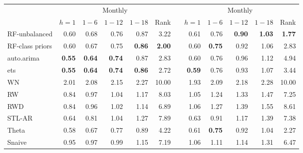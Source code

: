 \documentclass[11pt,a4paper,]{article}
\theoremstyle{definition}
\theoremstyle{definition}
\theoremstyle{definition}
\theoremstyle{remark}
\begin{document}
\begin{table}[!htbp]
\begin{tabular}{lrrrrrrrrrrr}
           &                                   \multicolumn{ 5}{c}{Monthly} &            &                                   \multicolumn{ 5}{c}{Monthly} \\
                     &    $h=1$ &    $1-6$   &     $1-12$ &    $1-18$  &   Rank     &            &   $h=1$  &    $1-6$   &    $1-12$  &    $1-18$  &   Rank \\\cmidrule(lr){2-6} \cmidrule(lr){8-12}
RF-unbalanced        &       0.60 &       0.68 &       0.76 &       0.87 &       3.22 &            &       0.61 &       0.76 & {\bf 0.90} & {\bf 1.03} &       {\bf 1.77} \\
RF-class priors      &       0.60 &       0.67 & 0.75 & {\bf 0.86} &       {\bf 2.00} &            &       0.60 &       {\bf 0.75} &       0.92 &       1.06 &        2.83 \\
auto.arima           &      {\bf 0.55 }&      {\bf 0.64} &      {\bf 0.74} &       0.87 &       2.83 &            &       0.60 &       0.76 &       0.96 &       1.12 &       4.94 \\
ets                  & {\bf 0.55} & {\bf 0.64} & {\bf 0.74} &       {\bf 0.86} & 2.72 &            &      {\bf 0.59} &       0.76 &       0.93 &       1.07 &       3.44 \\
WN                   &       2.01 &       2.08 &       2.15 &       2.27 &      10.00 &            &       1.93 &       2.09 &       2.18 &       2.28 &      10.00 \\
RW                   &       0.84 &       0.97 &       1.04 &       1.17 &    8.03 &            &       1.05 &       1.24 &       1.33 &       1.47 &      7.25 \\
RWD                  &       0.84 &       0.96 &       1.02 &       1.14 &       6.89 &            &       1.06 &       1.27 &       1.39 &       1.55 &      8.61 \\
STL-AR               &       0.64 &       0.81 &       1.04 &       1.27 &       7.89 &            &       0.63 &       0.91 &       1.17 &       1.39 &       7.38 \\
Theta                &       0.58 &       0.67 &       0.77 &       0.89 &       4.22 &            & 0.61 & {\bf 0.75} &       0.92 &       1.04 & 2.27 \\
Snaive               &       0.95 &       0.97 &       0.99 &       1.15 &       7.19 &            &       1.06 &       1.11 &       1.14 &       1.31 &       6.47 \\
\bottomrule
\end{tabular}
\end{table}
\end{document}
